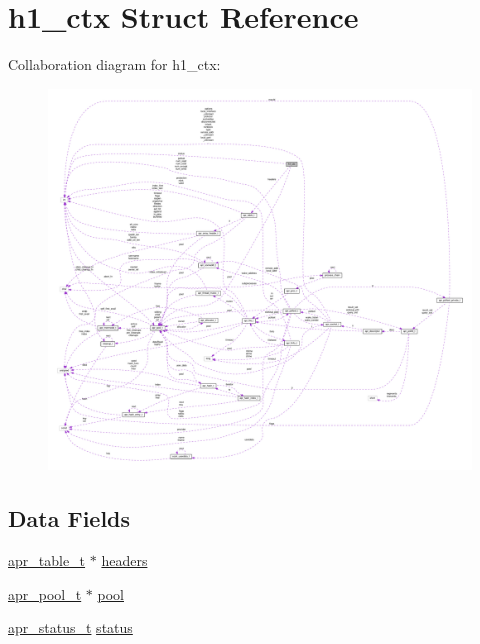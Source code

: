 \hypertarget{structh1__ctx}{}\section{h1\+\_\+ctx Struct Reference}
\label{structh1__ctx}


Collaboration diagram for h1\+\_\+ctx\+:
\nopagebreak
\begin{figure}[H]
\begin{center}
\leavevmode
\includegraphics[width=350pt]{structh1__ctx__coll__graph}
\end{center}
\end{figure}
\subsection*{Data Fields}
\begin{DoxyCompactItemize}
\item 
\hyperlink{structapr__table__t}{apr\+\_\+table\+\_\+t} $\ast$ \hyperlink{structh1__ctx_a7459d23a81c2e571171767f2ead334eb}{headers}
\item 
\hyperlink{structapr__pool__t}{apr\+\_\+pool\+\_\+t} $\ast$ \hyperlink{structh1__ctx_a0d6999735f5c6fe98f9f4222566f9ad6}{pool}
\item 
\hyperlink{group__apr__errno_gaa5105fa83cc322f09382292db8b47593}{apr\+\_\+status\+\_\+t} \hyperlink{structh1__ctx_a031d6eaa3944eee95c6a01614dfc0b4b}{status}
\end{DoxyCompactItemize}


